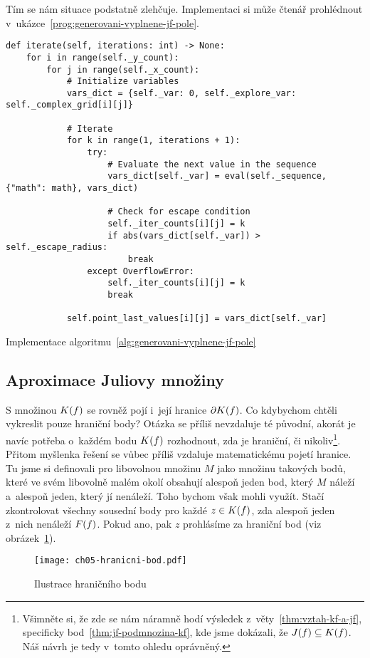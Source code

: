 Tím se nám situace podstatně zlehčuje. Implementaci si může čtenář prohlédnout v~ukázce~\ref{prog:generovani-vyplnene-jf-pole}.
\begin{program}[h]
\begin{lstlisting}[style=python]
def iterate(self, iterations: int) -> None:
    for i in range(self._y_count):
        for j in range(self._x_count):
            # Initialize variables
            vars_dict = {self._var: 0, self._explore_var: self._complex_grid[i][j]}

            # Iterate
            for k in range(1, iterations + 1):
                try:
                    # Evaluate the next value in the sequence
                    vars_dict[self._var] = eval(self._sequence, {"math": math}, vars_dict)

                    # Check for escape condition
                    self._iter_counts[i][j] = k
                    if abs(vars_dict[self._var]) > self._escape_radius:
                        break
                except OverflowError:
                    self._iter_counts[i][j] = k
                    break
            
            self.point_last_values[i][j] = vars_dict[self._var]
\end{lstlisting}
    \caption{Implementace algoritmu~\ref{alg:generovani-vyplnene-jf-pole}}
    \label{prog:generovani-vyplnene-jf-pole}
\end{program}

\subsection{Aproximace Juliovy množiny}\label{subsec:aproximace-juliovy-mnoziny}

S množinou $K(f)$ se rovněž pojí i~její hranice $\partial K(f)$. Co kdybychom chtěli vykreslit pouze hraniční body? Otázka se příliš nevzdaluje té původní, akorát je navíc potřeba o~každém bodu $K(f)$ rozhodnout, zda je hraniční, či nikoliv\footnote{Všimněte si, že zde se nám náramně hodí výsledek z~věty~\ref{thm:vztah-kf-a-jf}, specificky bod~\ref{thm:jf-podmnozina-kf}, kde jsme dokázali, že $J(f)\subseteq K(f)$. Náš návrh je tedy v~tomto ohledu oprávněný.}. Přitom myšlenka řešení se vůbec příliš vzdaluje matematickému pojetí hranice. Tu jsme si definovali pro libovolnou množinu $M$ jako množinu takových bodů, které ve svém libovolně malém okolí obsahují alespoň jeden bod, který $M$ náleží a~alespoň jeden, který jí nenáleží. Toho bychom však mohli využít. Stačí zkontrolovat všechny sousední body pro každé $z\in K(f)$, zda alespoň jeden z~nich nenáleží $F(f)$. Pokud ano, pak $z$ prohlásíme za hraniční bod (viz obrázek~\ref{fig:hranicni-bod}).
\begin{figure}[h]
    \centering
    \texttt{[image: ch05-hranicni-bod.pdf]}
    \caption{Ilustrace hraničního bodu}
    \label{fig:hranicni-bod}
\end{figure}

